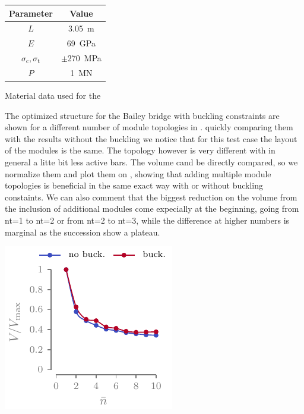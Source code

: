 \begin{margintable}
    \small
    \centering
    \begin{tabular}{cc}
    \toprule
    \textbf{Parameter}        & \textbf{Value} \\ \midrule
    $L$              & \qty{3.05}{m}     \\
    $E$              & \qty{69}{GPa}     \\
    $\sigma_\text{c}, \sigma_\text{t}$ & $\pm $\qty{270}{MPa} \\
    $P$              & \qty{1}{MN}   \\
    \bottomrule
    \end{tabular}
    \caption{Material data used for the }
    \label{tab:06_modular_tug_buck}
\end{margintable}

The optimized structure for the Bailey bridge with buckling constraints are shown for a different number of module topologies in . quickly comparing them with the results without the buckling we notice that for this test case the layout of the modules is the same. The topology however is very different with in general a litte bit less active bars. The volume cand be directly compared, so we normalize them and plot them on , showing that adding multiple module topologies is beneficial in the same exact way with or without buckling constaints. We can also comment that the biggest reduction on the volume from the inclusion of additional modules come expecially at the beginning, \eg going from nt=1 to nt=2 or from nt=2 to nt=3, while the difference at higher numbers is marginal as the succession show a plateau.

\begin{marginfigure}
    \centering
    \includegraphics{figures/06_DMO/00_tug_bench_crv/vol.pdf}
    \caption{}
    \label{fig:06_cant_volume_norm}
\end{marginfigure}

